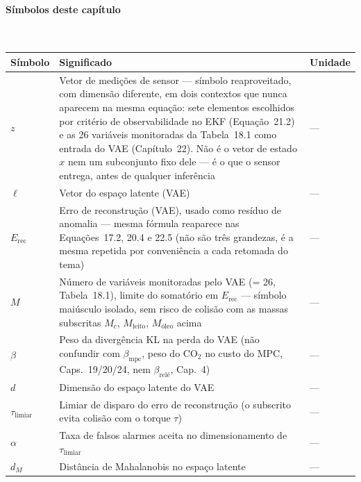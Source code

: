 \documentclass[12pt,a4paper]{article}
\numberwithin{equation}{section}
\numberwithin{table}{section}
\numberwithin{figure}{section}
\begin{document}
{\paragraph{Símbolos deste capítulo}\mbox{}\\[-0.5em]
{\small
\begin{longtable}{>{\raggedright\arraybackslash}p{2.6cm} >{\raggedright\arraybackslash}p{9.2cm} >{\raggedright\arraybackslash}p{2.6cm}}
	\toprule
	\textbf{Símbolo} & \textbf{Significado} & \textbf{Unidade} \\ \midrule
	\endhead
	$z$ & Vetor de medições de sensor — símbolo reaproveitado, com dimensão diferente, em dois contextos que nunca aparecem na mesma equação: sete elementos escolhidos por critério de observabilidade no EKF (Equação~21.2) e as 26 variáveis monitoradas da Tabela~18.1 como entrada do VAE (Capítulo~22). Não é o vetor de estado $x$ nem um subconjunto fixo dele — é o que o sensor entrega, antes de qualquer inferência & --- \\
	$\ell$\dag & Vetor do espaço latente (VAE) & --- \\
	$E_{\text{rec}}$ & Erro de reconstrução (VAE), usado como resíduo de anomalia — mesma fórmula reaparece nas Equações~17.2, 20.4 e 22.5 (não são três grandezas, é a mesma repetida por conveniência a cada retomada do tema) & --- \\
	$M$ & Número de variáveis monitoradas pelo VAE (= 26, Tabela~18.1), limite do somatório em $E_{\text{rec}}$ — símbolo maiúsculo isolado, sem risco de colisão com as massas subscritas $M_c$, $M_{\text{leito}}$, $M_{\text{óleo}}$ acima & --- \\
	$\beta$ & Peso da divergência KL na perda do VAE (não confundir com $\beta_{\text{mpc}}$, peso do CO$_2$ no custo do MPC, Caps.~19/20/24, nem $\beta_{\text{relé}}$, Cap.~4) & --- \\
	$d$ & Dimensão do espaço latente do VAE & --- \\
	$\tau_{\text{limiar}}$\dag & Limiar de disparo do erro de reconstrução (o subscrito evita colisão com o torque $\tau$) & --- \\
	$\alpha$ & Taxa de falsos alarmes aceita no dimensionamento de $\tau_{\text{limiar}}$ & --- \\
	$d_M$ & Distância de Mahalanobis no espaço latente & --- \\
	\bottomrule
\end{longtable}
}

}
\end{document}
